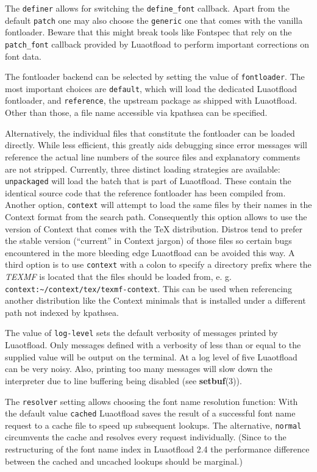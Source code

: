 \documentclass[a4paper]{article}
\begin{document}
The \texttt{definer} allows for switching the \texttt{define\_font} callback.
Apart from the default \texttt{patch} one may also choose the \texttt{generic}
one that comes with the vanilla fontloader. Beware that this might
break tools like Fontspec that rely on the \texttt{patch\_font} callback
provided by Luaotfload to perform important corrections on font data.

The fontloader backend can be selected by setting the value of
\texttt{fontloader}. The most important choices are \texttt{default}, which will
load the dedicated Luaotfload fontloader, and \texttt{reference}, the
upstream package as shipped with Luaotfload. Other than those, a file
name accessible via kpathsea can be specified.

Alternatively, the individual files that constitute the fontloader can
be loaded directly. While less efficient, this greatly aids debugging
since error messages will reference the actual line numbers of the
source files and explanatory comments are not stripped. Currently,
three distinct loading strategies are available: \texttt{unpackaged} will
load the batch that is part of Luaotfload. These contain the identical
source code that the reference fontloader has been compiled from.
Another option, \texttt{context} will attempt to load the same files by
their names in the Context format from the search path. Consequently
this option allows to use the version of Context that comes with the
TeX distribution. Distros tend to prefer the stable version (“current”
in Context jargon) of those files so certain bugs encountered in the
more bleeding edge Luaotfload can be avoided this way. A third option
is to use \texttt{context} with a colon to specify a directory prefix where
the \emph{TEXMF} is located that the files should be loaded from, e. g.
\texttt{context:\textasciitilde{}/context/tex/texmf-context}. This can be used when
referencing another distribution like the Context minimals that is
installed under a different path not indexed by kpathsea.

The value of \texttt{log-level} sets the default verbosity of messages
printed by Luaotfload. Only messages defined with a verbosity of less
than or equal to the supplied value will be output on the terminal.
At a log level of five Luaotfload can be very noisy. Also, printing too
many messages will slow down the interpreter due to line buffering
being disabled (see \textbf{setbuf}(3)).

The \texttt{resolver} setting allows choosing the font name resolution
function: With the default value \texttt{cached} Luaotfload saves the result
of a successful font name request to a cache file to speed up
subsequent lookups. The alternative, \texttt{normal} circumvents the cache
and resolves every request individually. (Since to the restructuring of
the font name index in Luaotfload 2.4 the performance difference
between the cached and uncached lookups should be marginal.)
\end{document}
